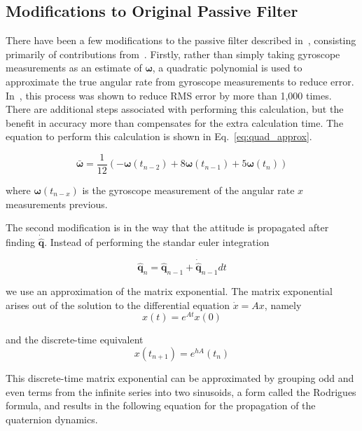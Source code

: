 \documentclass[paper=a4, fontsize=11pt]{scrartcl} %
\numberwithin{equation}{section} %
\numberwithin{figure}{section} %
\numberwithin{table}{section} %
\begin{document}
\subsection{Modifications to Original Passive Filter}
There have been a few modifications to the passive filter described in~\cite{Mahony2007}, consisting primarily of contributions from~\cite{Casey2013}.  Firstly, rather than simply taking gyroscope measurements as an estimate of $\bm{\omega}$, a quadratic polynomial is used to approximate the true angular rate from gyroscope measurements to reduce error.  In~\cite{Casey2013}, this process was shown to reduce RMS error by more than 1,000 times.  There are additional steps associated with performing this calculation, but the benefit in accuracy more than compensates for the extra calculation time.  The equation to perform this calculation is shown in Eq.~\ref{eq:quad_approx}.

\begin{equation}
	\bar{\bm{\omega}} = \frac{1}{12}\left(-\bm{\omega}\left(t_{n-2}\right) + 8\bm{\omega}\left(t_{n-1}\right) + 5\bm{\omega}\left(t_n\right) \right)
	\label{eq:quad_approx}
\end{equation}

where $\bm{\omega}(t_{n-x})$ is the gyroscope measurement of the angular rate $x$ measurements previous.

The second modification is in the way that the attitude is propagated after finding $\bm{\dot{\hat{q}}}$.  Instead of performing the standar euler integration

\begin{equation}
	\bm{\hat{q}}_n = \bm{\hat{q}}_{n-1}+\bm{\dot{\hat{q}}}_{n-1}dt
\end{equation}

we use an approximation of the matrix exponential.  The matrix exponential arises out of the solution to the differential equation $\dot{x} = Ax$, namely
\begin{equation}
	x(t) = e^{At} x(0)
\end{equation}

and the discrete-time equivalent
\begin{equation}
	x(t_{n+1}) = e^{hA}(t_n)
\end{equation}

This discrete-time matrix exponential can be approximated by grouping odd and even terms from the infinite series into two sinusoids, a form called the Rodrigues formula, and results in the following equation for the propagation of the quaternion dynamics.
\end{document}
